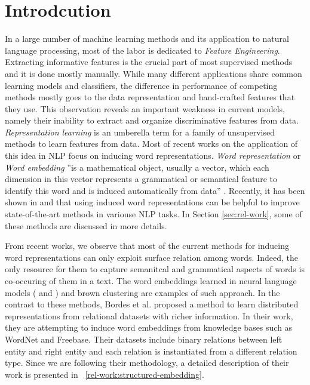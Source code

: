 \documentclass[preprint,12pt]{elsarticle}
\begin{document}

\section{Introdcution}
\label{sec:intro}
In a large number of machine learning methods and its application to natural language processing,
 most of the labor is dedicated to \emph{Feature Engineering}. Extracting informative features is the crucial part
of most supervised methods and it is done mostly manually. While many different
applications share common learning models and classifiers, the difference in
performance of competing methods mostly goes to the data representation and
hand-crafted features that they use. This observation reveals an important
weakness in current models, namely their inability to extract and organize
discriminative features from data. \emph{Representation learning} is an umberella term
for a family of unsupervised methods to learn features from data. Most of recent
works on the application of this idea in NLP focus on inducing word
representations. \emph{Word representation} or \emph{Word embedding} ''is a mathematical object, usually a
vector, which each dimension in this vector represents a grammatical or
semantical feature to identify this word and is induced automatically from data''
\cite{Turian2010b}. Recently, it has been shown in \cite{Turian2010b} and \cite{Collobert2011} that using
 induced word representations can be helpful to improve state-of-the-art methods in 
variouse NLP tasks. In Section \ref{sec:rel-work}, some of these methods are discussed in more details.


From recent works, we observe that most of the current methods for inducing word representations can
only exploit surface relation among words. 
Indeed, the only resource for them to capture semanitcal and grammatical aspects of words is co-occuring of them in 
a text.
The word embeddings learned in neural language models (\cite{Collobert2008a} and \cite{Bengio2003}) 
and brown clustering are examples of such approach.
In the contrast to these methods, Bordes et al. \cite{Bordes2011} proposed a method to 
learn distributed representations from relational datasets with richer information.
 In their work, they are  attempting to induce  word embeddings from knowledge bases such as WordNet and Freebase.
 Their datasets include binary relations between left entity and right entity and each relation is instantiated from 
 a different relation type. Since we are following their methodology, a detailed description of their work is presented
 in ~\ref{rel-work:structured-embedding}. 
 
\end{document}
